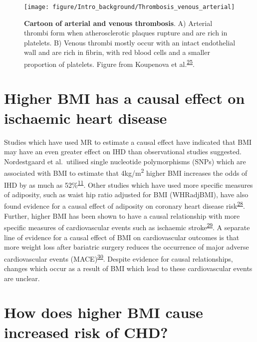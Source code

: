 \documentclass[11pt,twoside]{bristolthesis}
\begin{document}
\begin{figure}

{\centering \texttt{[image: figure/Intro\_background/Thrombosis\_venous\_arterial]} 

}

\caption[Cartoon of arterial and venous thrombosis]{\textbf{Cartoon of arterial and venous thrombosis}. A) Arterial thrombi form when atherosclerotic plaques rupture and are rich in platelets. B) Venous thrombi mostly occur with an intact endothelial wall and are rich in fibrin, with red blood cells and a smaller proportion of platelets. Figure from Koupenova et al.\textsuperscript{\protect\hyperlink{ref-Koupenova2017a}{25}}.}\label{fig:thrombi-cartoon}
\end{figure}
\hypertarget{higher-bmi-has-a-causal-effect-on-ischaemic-heart-disease}{%
\section{Higher BMI has a causal effect on ischaemic heart disease}\label{higher-bmi-has-a-causal-effect-on-ischaemic-heart-disease}}

Studies which have used MR to estimate a causal effect have indicated that BMI may have an even greater effect on IHD than observational studies suggested. Nordestgaard et al.~utilised single nucleotide polymorphisms (SNPs) which are associated with BMI to estimate that 4kg/m\textsuperscript{2} higher BMI increases the odds of IHD by as much as 52\%\textsuperscript{\protect\hyperlink{ref-Nordestgaard2012}{11}}. Other studies which have used more specific measures of adiposity, such as waist hip ratio adjusted for BMI (WHRadjBMI), have also found evidence for a causal effect of adiposity on coronary heart disease risk\textsuperscript{\protect\hyperlink{ref-Dale2017}{28}}. Further, higher BMI has been shown to have a causal relationship with more specific measures of cardiovascular events such as ischaemic stroke\textsuperscript{\protect\hyperlink{ref-Harshfield2021}{29}}. A separate line of evidence for a causal effect of BMI on cardiovascular outcomes is that more weight loss after bariatric surgery reduces the occurrence of major adverse cardiovascular events (MACE)\textsuperscript{\protect\hyperlink{ref-Jimenez2021}{30}}. Despite evidence for causal relationships, changes which occur as a result of BMI which lead to these cardiovascular events are unclear.

\hypertarget{how-does-higher-bmi-cause-increased-risk-of-chd}{%
\section{How does higher BMI cause increased risk of CHD?}\label{how-does-higher-bmi-cause-increased-risk-of-chd}}
\end{document}
